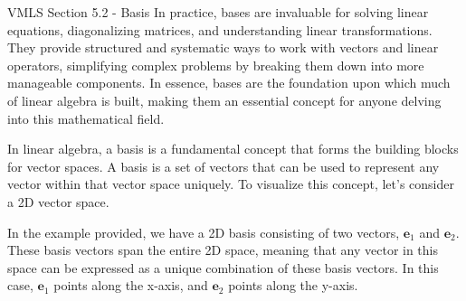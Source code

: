 \begin{notes}{VMLS Section 5.2 - Basis}
    In practice, bases are invaluable for solving linear equations, diagonalizing matrices, and understanding linear transformations. They provide structured and systematic ways to work with vectors 
    and linear operators, simplifying complex problems by breaking them down into more manageable components. In essence, bases are the foundation upon which much of linear algebra is built, making 
    them an essential concept for anyone delving into this mathematical field.

    \begin{Highlight}
        In linear algebra, a basis is a fundamental concept that forms the building blocks for vector spaces. A basis is a set of vectors that can be used to represent any vector within that vector space 
        uniquely. To visualize this concept, let's consider a 2D vector space.
    
        \begin{center}
        \end{center}
    
        In the example provided, we have a 2D basis consisting of two vectors, $\mathbf{e}_1$ and $\mathbf{e}_2$. These basis vectors span the entire 2D space, meaning that any vector in this space can be 
        expressed as a unique combination of these basis vectors. In this case, $\mathbf{e}_1$ points along the x-axis, and $\mathbf{e}_2$ points along the y-axis.


\end{Highlight}
\end{notes}
